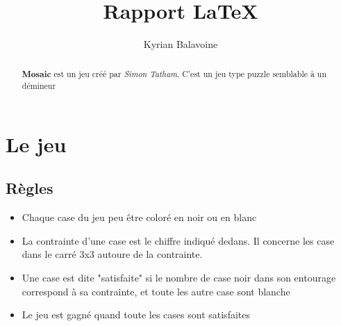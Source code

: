 \documentclass{article}
\title{Rapport \LaTeX}
\author{Kyrian Balavoine}
\begin{document}
    \maketitle

    \begin{abstract}
        \textbf{Mosaic} est un jeu créé par \emph{Simon Tatham}. C'est un jeu type puzzle semblable à un démineur
    \end{abstract}
    \tableofcontents
    \section{Le jeu}

        \subsection{Règles}
        
            \begin{itemize}
                \item Chaque case du jeu peu être coloré en noir ou en blanc
                \item La contrainte d'une case est le chiffre indiqué dedans. Il concerne les case dans le carré 3x3 autoure de la contrainte.
                \item Une case est dite "satisfaite" si le nombre de case noir dans son entourage correspond à sa contrainte, et toute les autre case sont blanche
                \item Le jeu est gagné quand toute les cases sont satisfaites
            \end{itemize}
\end{document}
